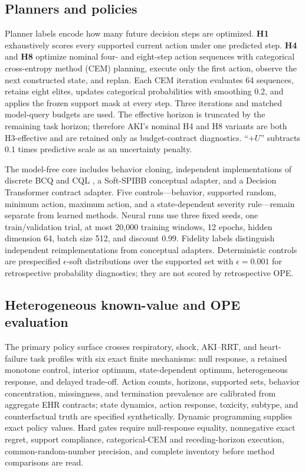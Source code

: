 \documentclass[sigconf,review]{acmart}
\begin{document}
\subsection{Planners and policies}

Planner labels encode how many future decision steps are optimized. \textbf{H1} exhaustively scores every supported current action under one predicted step. \textbf{H4} and \textbf{H8} optimize nominal four- and eight-step action sequences with categorical cross-entropy method (CEM) planning, execute only the first action, observe the next constructed state, and replan. Each CEM iteration evaluates 64 sequences, retains eight elites, updates categorical probabilities with smoothing 0.2, and applies the frozen support mask at every step. Three iterations and matched model-query budgets are used. The effective horizon is truncated by the remaining task horizon; therefore AKI's nominal H4 and H8 variants are both H3-effective and are retained only as budget-contract diagnostics. ``$+U$'' subtracts $0.1$ times predictive scale as an uncertainty penalty.

The model-free core includes behavior cloning, independent implementations of discrete BCQ \cite{fujimoto2019off} and CQL \cite{kumar2020conservative}, a Soft-SPIBB conceptual adapter, and a Decision Transformer contract adapter. Five controls---behavior, supported random, minimum action, maximum action, and a state-dependent severity rule---remain separate from learned methods. Neural runs use three fixed seeds, one train/validation trial, at most 20,000 training windows, 12 epochs, hidden dimension 64, batch size 512, and discount 0.99. Fidelity labels distinguish independent reimplementations from conceptual adapters. Deterministic controls are prespecified $\epsilon$-soft distributions over the supported set with $\epsilon=0.001$ for retrospective probability diagnostics; they are not scored by retrospective OPE.

\subsection{Heterogeneous known-value and OPE evaluation}

The primary policy surface crosses respiratory, shock, AKI--RRT, and heart-failure task profiles with six exact finite mechanisms: null response, a retained monotone control, interior optimum, state-dependent optimum, heterogeneous response, and delayed trade-off. Action counts, horizons, supported sets, behavior concentration, missingness, and termination prevalence are calibrated from aggregate EHR contracts; state dynamics, action response, toxicity, subtype, and counterfactual truth are specified synthetically. Dynamic programming supplies exact policy values. Hard gates require null-response equality, nonnegative exact regret, support compliance, categorical-CEM and receding-horizon execution, common-random-number precision, and complete inventory before method comparisons are read.
\end{document}
